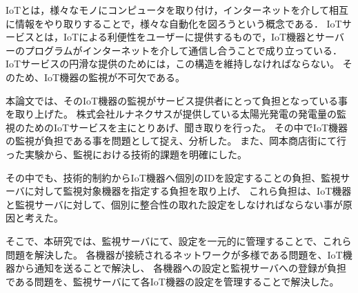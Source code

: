 IoTとは，様々なモノにコンピュータを取り付け，インターネットを介して相互に情報をやり取りすることで，様々な自動化を図ろうという概念である．
IoTサービスとは，IoTによる利便性をユーザーに提供するもので，IoT機器とサーバーのプログラムがインターネットを介して通信し合うことで成り立っている．
IoTサービスの円滑な提供のためには，この構造を維持しなければならない。
そのため、IoT機器の監視が不可欠である。
\medskip

本論文では、そのIoT機器の監視がサービス提供者にとって負担となっている事を取り上げた。
株式会社ルナネクサスが提供している太陽光発電の発電量の監視のためのIoTサービスを主にとりあげ、聞き取りを行った。
その中でIoT機器の監視が負担である事を問題として捉え、分析した。
また、岡本商店街にて行った実験から、監視における技術的課題を明確にした。

その中でも、技術的制約からIoT機器へ個別のIDを設定することの負担、監視サーバに対して監視対象機器を指定する負担を取り上げ、
これら負担は、IoT機器と監視サーバに対して、個別に整合性の取れた設定をしなければならない事が原因と考えた。


\begin{comment}
IoT機器の監視には、次のような技術的課題があることが分かった。
\begin{itemize}
\item ネットワークの監視はIoTサービスが提供する機能とは別の機能である事
\item IoT機器の接続されるネットワークは想定できない事
\item IoT機器の接続されるネットワークがプライベートアドレスである場合が多い事
\item IoT機器は大量に利用される為、サーバへ設定することが負担となること
\end{itemize}
\medskip

そこで，本研究では，IoT機器から通知を送ることで，IoT機器が接続されるネットワークによらない機器の監視を実現し、IoTサービスとは別個の機器監視サービスとして開発することで、提供者の負担を軽減することを提案した。
既存手法では何が足りないのか議論し、IoTサービスの実践やサービス提供者への聞き取りを通して、サービスに必要な要件を抽出し、設計を行った。
\end{comment}

そこで、本研究では、監視サーバにて、設定を一元的に管理することで、これら問題を解決した。
各機器が接続されるネットワークが多様である問題を、IoT機器から通知を送ることで解決し、
各機器への設定と監視サーバへの登録が負担である問題を、監視サーバにて各IoT機器の設定を管理することで解決した。


